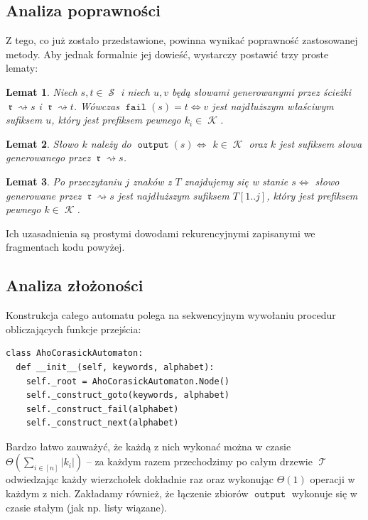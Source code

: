 \documentclass{article}
\newtheorem*{lemma}{Lemat}
\DeclareMathOperator{\rot}{\mathfrak{r}}
\DeclareMathOperator{\K}{\mathcal{K}}
\DeclareMathOperator{\states}{\mathcal{S}}
\DeclareMathOperator{\trie}{\mathcal{T}}
\DeclareMathOperator{\fail}{\texttt{fail}}
\DeclareMathOperator{\out}{\texttt{output}}
\begin{document}
\subsection{Analiza poprawności}
Z tego, co już zostało przedstawione, powinna wynikać poprawność zastosowanej metody. Aby jednak formalnie jej dowieść, wystarczy postawić trzy proste lematy:

\begin{lemma}
Niech $s,t\in\states$ i niech $u, v$ będą słowami generowanymi przez ścieżki $\rot\rightsquigarrow s$ i $\rot\rightsquigarrow t$. Wówczas $\fail(s) = t \iff v$ jest najdłuższym właściwym sufiksem $u$, który jest prefiksem pewnego $k_i\in\K$. 
\end{lemma}

\begin{lemma}
Słowo $k$ należy do $\out(s)\iff$ $k\in\K$ oraz $k$ jest sufiksem słowa generowanego przez $\rot\rightsquigarrow s$.
\end{lemma}

\begin{lemma}
Po przeczytaniu $j$ znaków z $T$ znajdujemy się w stanie $s\iff$ słowo generowane przez $\rot\rightsquigarrow s$ jest najdłuższym sufiksem $T[1..j]$, który jest prefiksem pewnego $k\in\K$.
\end{lemma}

\noindent Ich uzasadnienia są prostymi dowodami rekurencyjnymi zapisanymi we fragmentach kodu powyżej.

\subsection{Analiza złożoności}
Konstrukcja całego automatu polega na sekwencyjnym wywołaniu procedur obliczających funkcje przejścia:

\begin{verbatim}
class AhoCorasickAutomaton:
  def __init__(self, keywords, alphabet):
    self._root = AhoCorasickAutomaton.Node()
    self._construct_goto(keywords, alphabet)
    self._construct_fail(alphabet)
    self._construct_next(alphabet)
\end{verbatim}

Bardzo łatwo zauważyć, że każdą z nich wykonać można w czasie $\Theta(\sum_{i\in[n]}|k_i|)$ -- za każdym razem przechodzimy po całym drzewie $\trie$ odwiedzając każdy wierzchołek dokładnie raz oraz wykonując $\Theta(1)$ operacji w każdym z nich. Zakładamy również, że łączenie zbiorów $\out$ wykonuje się w czasie stałym (jak np. listy wiązane).
\end{document}
